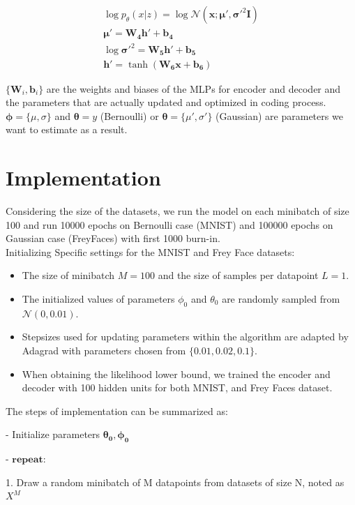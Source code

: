 \documentclass[11pt]{article}
\begin{document}
\begin{eqnarray}
\log p_\theta(x|z)=\log\mathcal{N}(\mathbf{x}; \mathbf{\mu}', \mathbf{\sigma}'^2\mathbf{I})\\
\mathbf{\mu}'=\mathbf{W_4h'}+\mathbf{b_4}\\
\log\mathbf{\sigma}'^2=\mathbf{W_5h'}+\mathbf{b_5}\\
\mathbf{h'}=\tanh(\mathbf{W_6x}+\mathbf{b_6})
\end{eqnarray}

$\{\mathbf{W}_i, \mathbf{b}_i\}$ are the weights and biases of the MLPs for encoder and decoder and the parameters that are actually updated and optimized in coding process. $\mathbf{\phi}=\{\mu, \sigma\}$ and $\mathbf{\theta}=y$ (Bernoulli) or $\mathbf{\theta}=\{\mu', \sigma'\}$ (Gaussian) are parameters we want to estimate as a result.

\section{Implementation}
Considering the size of the datasets, we run the model on each minibatch of size 100 and run 10000 epochs on Bernoulli case (MNIST) and 100000 epochs on Gaussian case (FreyFaces) with first 1000 burn-in. \\

Initializing Specific settings for the MNIST and Frey Face datasets: 
\begin{itemize}
\item The size of minibatch $M=100$ and the size of samples per datapoint $L=1$.
\item The initialized values of parameters $\phi_0$ and $\theta_0$ are randomly sampled from $\mathcal{N}(0,0.01)$.
\item Stepsizes used for updating parameters within the algorithm are adapted by Adagrad with parameters chosen from $\{0.01, 0.02, 0.1\}$.
\item When obtaining the likelihood lower bound, we trained the encoder and decoder with 100 hidden units for both MNIST, and Frey Faces dataset.
\end{itemize}

The steps of implementation can be summarized as: 

- Initialize parameters $\mathbf{\theta_0, \phi_0}$ 

- $\textbf{repeat}$:  

1. Draw a random minibatch of M datapoints from datasets of size N, noted as $X^M$ 
\end{document}
